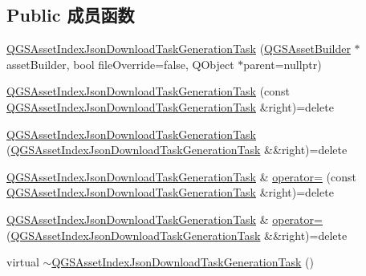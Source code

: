 \subsection*{Public 成员函数}
\begin{DoxyCompactItemize}
\item 
\mbox{\hyperlink{class_q_g_s_asset_index_json_download_task_generation_task_a7573e75179001680e095ac8db65e7675}{Q\+G\+S\+Asset\+Index\+Json\+Download\+Task\+Generation\+Task}} (\mbox{\hyperlink{class_q_g_s_asset_builder}{Q\+G\+S\+Asset\+Builder}} $\ast$asset\+Builder, bool file\+Override=false, Q\+Object $\ast$parent=nullptr)
\item 
\mbox{\hyperlink{class_q_g_s_asset_index_json_download_task_generation_task_a4c22d57feb3ff06f5b81274484de06b7}{Q\+G\+S\+Asset\+Index\+Json\+Download\+Task\+Generation\+Task}} (const \mbox{\hyperlink{class_q_g_s_asset_index_json_download_task_generation_task}{Q\+G\+S\+Asset\+Index\+Json\+Download\+Task\+Generation\+Task}} \&right)=delete
\item 
\mbox{\hyperlink{class_q_g_s_asset_index_json_download_task_generation_task_a273d10ab3de45ffc5d58b03fd402583d}{Q\+G\+S\+Asset\+Index\+Json\+Download\+Task\+Generation\+Task}} (\mbox{\hyperlink{class_q_g_s_asset_index_json_download_task_generation_task}{Q\+G\+S\+Asset\+Index\+Json\+Download\+Task\+Generation\+Task}} \&\&right)=delete
\item 
\mbox{\hyperlink{class_q_g_s_asset_index_json_download_task_generation_task}{Q\+G\+S\+Asset\+Index\+Json\+Download\+Task\+Generation\+Task}} \& \mbox{\hyperlink{class_q_g_s_asset_index_json_download_task_generation_task_a60b3803995b0094f04baec39dc7bc3a9}{operator=}} (const \mbox{\hyperlink{class_q_g_s_asset_index_json_download_task_generation_task}{Q\+G\+S\+Asset\+Index\+Json\+Download\+Task\+Generation\+Task}} \&right)=delete
\item 
\mbox{\hyperlink{class_q_g_s_asset_index_json_download_task_generation_task}{Q\+G\+S\+Asset\+Index\+Json\+Download\+Task\+Generation\+Task}} \& \mbox{\hyperlink{class_q_g_s_asset_index_json_download_task_generation_task_a09ce61b1c36b94f45e824886a23e4e18}{operator=}} (\mbox{\hyperlink{class_q_g_s_asset_index_json_download_task_generation_task}{Q\+G\+S\+Asset\+Index\+Json\+Download\+Task\+Generation\+Task}} \&\&right)=delete
\item 
virtual \mbox{\hyperlink{class_q_g_s_asset_index_json_download_task_generation_task_a7381b8252315bba9a6ce2e9d11ffdb56}{$\sim$\+Q\+G\+S\+Asset\+Index\+Json\+Download\+Task\+Generation\+Task}} ()
\end{DoxyCompactItemize}
